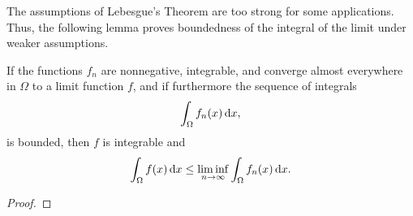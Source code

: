 The assumptions of Lebesgue's Theorem are too strong for some
applications. Thus, the following lemma proves boundedness of the
integral of the limit under weaker assumptions.

\begin{lemma}[Fatou]
If the functions $f_n$ are nonnegative, integrable, and converge
almost everywhere in $\Omega$ to a limit function $f$, and if
furthermore the sequence of integrals
\begin{gather*}
  \int_\Omega f_n(x) \,\mathrm{d} x,
\end{gather*}
is bounded, then $f$ is integrable and
\begin{gather*}
  \int_\Omega f(x)\,\mathrm{d} x \le \liminf_{n\to\infty} \int_\Omega f_n(x) \,\mathrm{d} x.
\end{gather*}
\end{lemma}

\begin{todo}
  \begin{proof}
  \end{proof}
\end{todo}
